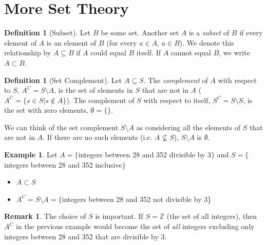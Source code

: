\documentclass[openany]{book}
\theoremstyle{definition}
\newtheorem{definition}[thm]{Definition}
\newtheorem{rem}[thm]{Remark}
\newtheorem{example}[thm]{Example}
\begin{document}
\section{More Set Theory}
\begin{definition}[Subset]\hfill

    Let $B$ be some set. Another set $A$ is a \emph{subset} of $B$ if every element of $A$ is an element of $B$ (for every $a\in A$, $a\in B$). We denote this relationship by $A\subseteq B$ if $A$ could equal $B$ itself. If $A$ cannot equal $B$, we write $A\subset B$.  
\end{definition}
\begin{definition}[Set Complement]\hfill

    Let $A\subseteq S$. The \emph{complement} of $A$ with respect to $S$, $A^C=S\setminus A$, is the set of elements in $S$ that are not in $A$ ($A^C=\{s\in S|s\notin A\}$). The complement of $S$ with respect to itself, $S^C=S\setminus S$, is the set with zero elements, $\emptyset=\{\}$. 
\end{definition}
  We can think of the set complement $S\setminus A$ as considering all the elements of $S$ that are not in $A$. If there are no such elements (i.e. $A\nsubseteq S$), $S\setminus A$ is $\emptyset$.\\
\begin{example}\hfill

Let $A=\{$integers between 28 and 352 divisible by 3$\}$ and $S=\{$integers between 28 and 352 inclusive$\}$
    \begin{itemize}
        \item $A\subset S$
        \item $A^C=S\setminus A=\{$integers between 28 and 352 not divisible by 3\}
    \end{itemize}
    
\end{example}
  
    \begin{rem}\hfill
    
        The choice of $S$ is important. If $S=\mathbb{Z}$ (the set of all integers), then $A^C$ in the previous example would become the set of \emph{all} integers excluding only integers between 28 and 352 that are divisible by 3. 
    \end{rem}
\end{document}

